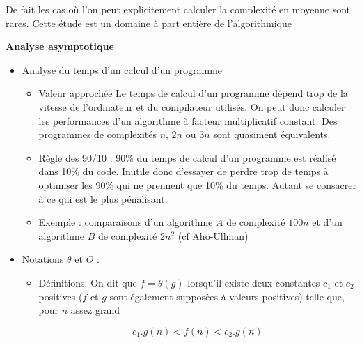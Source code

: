 \begin{multicols}{2}
{

De fait les cas o\`u l'on peut explicitement calculer la complexit\'e en moyenne
sont rares. 
Cette \'etude est un domaine \`a part enti\`ere de l'algorithmique

{\bf Analyse asymptotique}

\begin{itemize} 
   \item  Analyse du temps d'un calcul d'un programme

		\begin{itemize} 

        \item  Valeur approch\'ee Le temps de calcul d'un programme d\'epend trop de
          la vitesse de l'ordinateur et du compilateur utilis\'es. On peut donc
          calculer les performances d'un algorithme \`a facteur multiplicatif
          constant. Des programmes de complexit\'es $n$, $2n$ ou $3n$
		  sont quasiment \'equivalents.

        \item  R\`egle des 90/10 : 90\% du temps de calcul d'un programme est
          r\'ealis\'e dans 10\% du code. Inutile donc d'essayer de perdre trop de
          temps \`a optimiser les 90\% qui ne prennent que 10\% du temps. Autant
          se consacrer \`a ce qui est le plus p\'enalisant.

        \item  Exemple : comparaisons d'un algorithme $A$ de complexit\'e $100 n$ 
			   et d'un algorithme $B$ de complexit\'e $2n^{2}$ (cf Aho-Ullman)

		\end{itemize} 

   \item  Notations $\theta$ et $O$ :

		\begin{itemize} 
        \item  D\'efinitions.
          On dit que $f=\theta(g)$ lorsqu'il existe deux constantes $c_{1}$
		  et $c_{2}$
          positives ($f$ et $g$ sont \'egalement suppos\'ees \`a valeurs positives)
          telle que, pour $n$ assez grand

          \[ c_{1}.g(n) < f(n) < c_{2}.g(n) \]


\end{itemize}
\end{itemize}}
\end{multicols}
